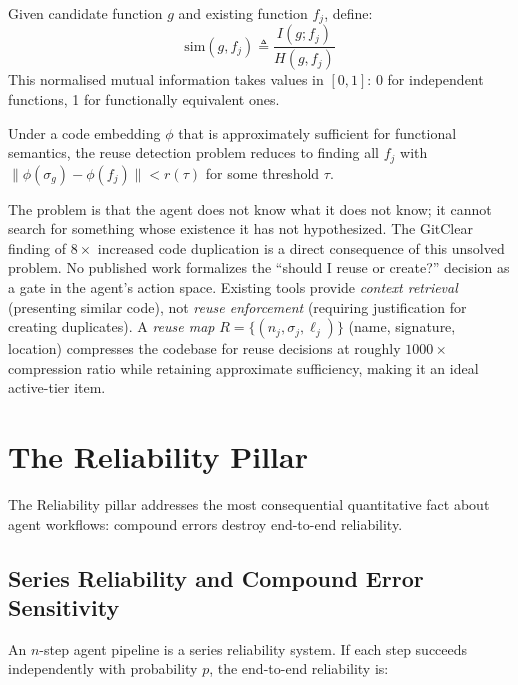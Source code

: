 \begin{definition}
Given candidate function $g$ and existing function $f_j$, define:
\begin{equation}
    \text{sim}(g, f_j) \triangleq \frac{I(g; f_j)}{H(g, f_j)}
\end{equation}
This normalised mutual information takes values in $[0,1]$: 0 for independent functions, 1 for functionally equivalent ones.
\end{definition}

Under a code embedding $\phi$ that is approximately sufficient for functional semantics, the reuse detection problem reduces to finding all $f_j$ with $\|\phi(\sigma_g) - \phi(f_j)\| < r(\tau)$ for some threshold $\tau$.

The problem is that the agent does not know what it does not know; it cannot search for something whose existence it has not hypothesized. The GitClear finding of $8\times$ increased code duplication \citep{gitclear2025} is a direct consequence of this unsolved problem. No published work formalizes the ``should I reuse or create?'' decision as a gate in the agent's action space. Existing tools provide \emph{context retrieval} (presenting similar code), not \emph{reuse enforcement} (requiring justification for creating duplicates). A \emph{reuse map} $R = \{(n_j, \sigma_j, \ell_j)\}$ (name, signature, location) compresses the codebase for reuse decisions at roughly $1000\times$ compression ratio while retaining approximate sufficiency, making it an ideal active-tier item.


\section{The Reliability Pillar}
\label{sec:reliability}

The Reliability pillar \citep{pillar-reliability} addresses the most consequential quantitative fact about agent workflows: compound errors destroy end-to-end reliability.

\subsection{Series Reliability and Compound Error Sensitivity}

An $n$-step agent pipeline is a series reliability system. If each step succeeds independently with probability $p$, the end-to-end reliability is:

